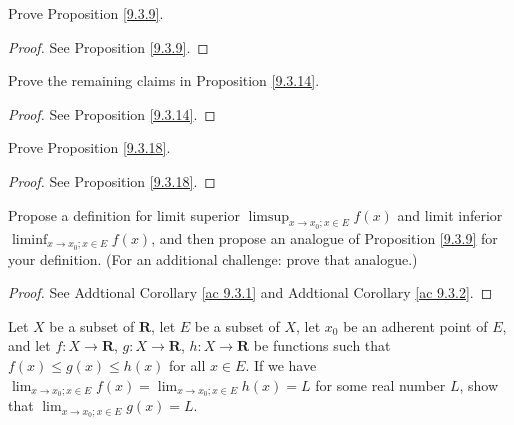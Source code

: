 \exercisesection

\begin{exercise}\label{ex 9.3.1}
    Prove Proposition \ref{9.3.9}.
\end{exercise}

\begin{proof}
    See Proposition \ref{9.3.9}.
\end{proof}

\begin{exercise}\label{ex 9.3.2}
    Prove the remaining claims in Proposition \ref{9.3.14}.
\end{exercise}

\begin{proof}
    See Proposition \ref{9.3.14}.
\end{proof}

\begin{exercise}\label{ex 9.3.3}
    Prove Proposition \ref{9.3.18}.
\end{exercise}

\begin{proof}
    See Proposition \ref{9.3.18}.
\end{proof}

\begin{exercise}\label{ex 9.3.4}
    Propose a definition for limit superior \(\limsup_{x \to x_0 ; x \in E} f(x)\) and limit inferior \(\liminf_{x \to x_0 ; x \in E} f(x)\), and then propose an analogue of Proposition \ref{9.3.9} for your definition.
    (For an additional challenge: prove that analogue.)
\end{exercise}

\begin{proof}
    See Addtional Corollary \ref{ac 9.3.1} and Addtional Corollary \ref{ac 9.3.2}.
\end{proof}

\begin{exercise}\label{ex 9.3.5}
    Let \(X\) be a subset of \(\mathbf{R}\), let \(E\) be a subset of \(X\), let \(x_0\) be an adherent point of \(E\), and let \(f : X \to \mathbf{R}\), \(g : X \to \mathbf{R}\), \(h : X \to \mathbf{R}\) be functions such that \(f(x) \leq g(x) \leq h(x)\) for all \(x \in E\).
    If we have \(\lim_{x \to x_0 ; x \in E} f(x) = \lim_{x \to x_0 ; x \in E} h(x) = L\) for some real number \(L\), show that \(\lim_{x \to x_0 ; x \in E} g(x) = L\).
\end{exercise}

